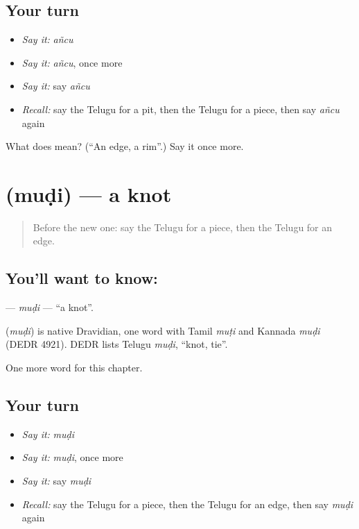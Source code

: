 \subsection*{Your turn}
\begin{itemize}
\raggedright
  \item \emph{Say it:} \emph{añcu}
  \item \emph{Say it:} \emph{añcu}, once more
  \item \emph{Say it:} say \emph{añcu}
  \item \emph{Recall:} say the Telugu for a pit, then the Telugu for a piece, then say \emph{añcu} again
\end{itemize}

\begin{tcolorbox}[breakable,colback=teal!4,colframe=teal!35!black,title={Before you move on}]
What does  mean? (\textquotedblleft{}An edge, a rim\textquotedblright{}.) Say it once more.
\end{tcolorbox}
\section[\texorpdfstring{\te{ముడి} (muḍi)}{ముడి (muḍi)}]{ (muḍi) — a knot}

\label{lesson:TE-C308-mudi}



\begin{quote}
Before the new one: say the Telugu for a piece, then the Telugu for an edge.
\end{quote}

\subsection*{You'll want to know: }
\textbf{} — \emph{muḍi} — \textquotedblleft{}a knot\textquotedblright{}.

\begin{cousinweb}
\textbf{} (\emph{muḍi}) is native Dravidian, one word with Tamil \emph{muṭi} and Kannada \emph{muḍi} (DEDR 4921). DEDR lists Telugu \emph{muḍi}, \textquotedblleft{}knot, tie\textquotedblright{}.
\end{cousinweb}

\begin{grammarlens}[title={What you've built}]
One more word for this chapter.
\end{grammarlens}

\subsection*{Your turn}
\begin{itemize}
\raggedright
  \item \emph{Say it:} \emph{muḍi}
  \item \emph{Say it:} \emph{muḍi}, once more
  \item \emph{Say it:} say \emph{muḍi}
  \item \emph{Recall:} say the Telugu for a piece, then the Telugu for an edge, then say \emph{muḍi} again
\end{itemize}

